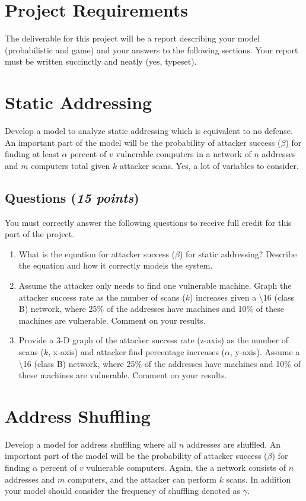 \documentclass[10pt]{article}
\newcommand{\Questions}[1]{
\subsection*{Questions {\rm \normalsize (\textsf{\textit{#1 points}})}}
}
\begin{document}
\vfill
\newpage

\section*{Project Requirements}

The deliverable for this project will be a report describing your model (probabilistic and game) and your answers to the following sections. Your report must be written succinctly and neatly (yes, typeset).

\section{Static Addressing}

Develop a model to analyze static addressing which is equivalent to no defense. An important part of the model will be the probability of attacker success ($\beta$) for finding at least $\alpha$ percent of $v$ vulnerable computers in a network of $n$ addresses and $m$ computers total given $k$ attacker scans. Yes, a lot of variables to consider.

\Questions{15}
You must correctly answer the following questions to receive full credit for this part of the project.
\begin{enumerate}
  \item What is the equation for attacker success ($\beta$) for static addressing? Describe the equation and how it correctly models the system.
  \item Assume the attacker only needs to find one vulnerable machine. Graph the attacker success rate as the number of scans ($k$) increases given a  \textbackslash 16 (class B) network, where 25\% of the addresses have machines and 10\% of these machines are vulnerable. Comment on your results.
    \item Provide a 3-D graph of the attacker success rate (z-axis) as the number of scans ($k$, x-axis) and attacker find percentage increases ($\alpha$, y-axis). Assume a  \textbackslash 16 (class B) network, where 25\% of the addresses have machines and 10\% of these machines are vulnerable. Comment on your results.
\end{enumerate}

\section{Address Shuffling}

Develop a model for address shuffling where all $n$ addresses are shuffled. An important part of the model will be the probability of attacker success ($\beta$) for finding $\alpha$ percent of $v$ vulnerable computers. Again, the a network consists of $n$ addresses and $m$ computers, and the attacker can perform $k$ scans. In addition your model should consider the frequency of shuffling denoted as $\gamma$.
\end{document}
